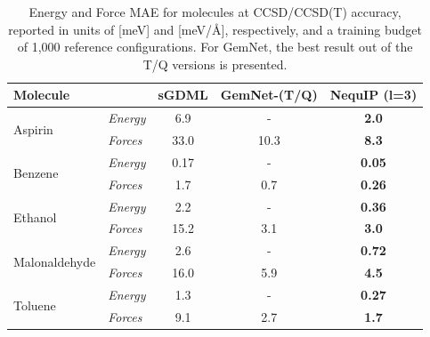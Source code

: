 \documentclass[%
reprint,
superscriptaddress,
nofootinbib,
amsmath,amssymb,
aps,
prl,
]{revtex4-1}
\begin{document}
\begin{table}[!htbp]
\centering
\begin{tabular}{llccc}
\hline \hline
Molecule & & sGDML & GemNet-(T/Q) & NequIP (l=3) \\
\hline
\multirow{2}{*}{Aspirin}  & \textit{Energy} & 6.9 & - & \textbf{2.0} \\ 
                          & \textit{Forces} & 33.0 & 10.3 & \textbf{ 8.3} \\ \hline

\multirow{2}{*}{Benzene}  & \textit{Energy} & 0.17 & - & \textbf{0.05} \\ 
                          & \textit{Forces} & 1.7 & 0.7 & \textbf{0.26}\\ \hline
                          
\multirow{2}{*}{Ethanol}  & \textit{Energy} & 2.2 & - & \textbf{0.36} \\ 
                          & \textit{Forces} & 15.2 & 3.1 & \textbf{3.0}  \\ \hline
                          
\multirow{2}{*}{Malonaldehyde}  & \textit{Energy} &2.6  & - & \textbf{0.72} \\ 
                          & \textit{Forces} & 16.0 & 5.9 & \textbf{4.5}  \\ \hline
                          
\multirow{2}{*}{Toluene}  & \textit{Energy} & 1.3 & - & \textbf{0.27} \\ 
                          & \textit{Forces} & 9.1 & 2.7 & \textbf{1.7} \\ \hline
  \hline \hline
    \end{tabular}
    \caption{Energy and Force MAE for molecules at CCSD/CCSD(T) accuracy, reported in units of [meV] and [meV/{\AA}], respectively, and a training budget of 1,000 reference configurations. For GemNet, the best result out of the T/Q versions is presented.}
    \label{tab:ccsdt}
\end{table}
\end{document}
